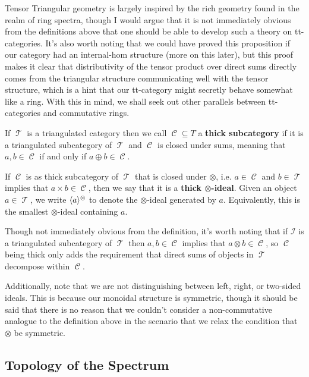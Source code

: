 \documentclass[11pt]{article}
\DeclareMathOperator{\CC}{\mathcal{C}}
\DeclareMathOperator{\TT}{\mathcal{T}}
\begin{document}
\begin{rmk}
Tensor Triangular geometry is largely inspired by the rich geometry found in the realm of ring spectra, though I would argue that it is not immediately obvious from the definitions above that one should be able to develop such a theory on tt-categories. It's also worth noting that we could have proved this proposition if our category had an internal-hom structure (more on this later), but this proof makes it clear that distributivity of the tensor product over direct sums directly comes from the triangular structure communicating well with the tensor structure, which is a hint that our tt-category might secretly behave somewhat like a ring. With this in mind, we shall seek out other parallels between tt-categories and commutative rings.
\end{rmk}

\begin{defn}
If $\TT$ is a triangulated category then we call $\CC \subseteq T$ a \textbf{thick subcategory} if it is a triangulated subcategory of $\TT$ and $\CC$ is closed under sums, meaning that $a,b \in \CC$ if and only if $a \oplus b \in \CC$.

If $\CC$ is as thick subcategory of $\TT$ that is closed under $\otimes$, i.e. $a \in \CC$ and $b \in \TT$ implies that $a \times b \in \CC$, then we say that it is a \textbf{thick $\otimes$-ideal}. Given an object $a \in \TT$, we write $\langle a \rangle^\otimes$ to denote the $\otimes$-ideal generated by $a$. Equivalently, this is the smallest $\otimes$-ideal containing $a$.
\end{defn}

\begin{rmk}
Though not immediately obvious from the definition, it's worth noting that if $\mathcal{I}$ is a triangulated subcategory of $\TT$ then $a,b \in \CC$ implies that $a \otimes b \in \CC$, so $\CC$ being thick only adds the requirement that direct sums of objects in $\TT$ decompose within $\CC$.

Additionally, note that we are not distinguishing between left, right, or two-sided ideals. This is because our monoidal structure is symmetric, though it should be said that there is no reason that we couldn't consider a non-commutative analogue to the definition above in the scenario that we relax the condition that $\otimes$ be symmetric.
\end{rmk}

\subsection{Topology of the Spectrum}
\end{document}
